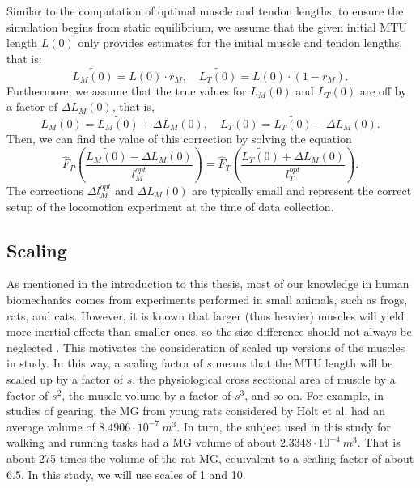 \documentclass{sfuthesis}
\numberwithin{equation}{section}
\numberwithin{figure}{chapter}
\numberwithin{table}{chapter}
\theoremstyle{definition}
\begin{document}
Similar to the computation of optimal muscle and tendon lengths, to ensure the simulation begins from static equilibrium, we assume that the given initial MTU length $L(0)$ only provides estimates for the initial muscle and tendon lengths, that is:
\begin{equation}
    \widetilde{L_M(0)} = L(0) \cdot r_M, \quad \widetilde{L_T(0)} = L(0) \cdot (1-r_M).
\end{equation}
Furthermore, we assume that the true values for $L_M(0)$ and $L_T(0)$ are off by a factor of $\Delta L_M(0)$, that is, 
\begin{equation}
    L_M(0) =  \widetilde{L_M(0)} + \Delta L_M(0), \quad L_T(0) = \widetilde{L_T(0)} - \Delta L_M(0).
\end{equation}
Then, we can find the value of this correction by solving the equation
\begin{equation} \label{eq:calibration_2}
    \widehat{F}_P \left( \dfrac{\widetilde{L_M(0)} - \Delta L_M(0)}{l_M^{opt}}\right) = \widehat{F}_T \left( \dfrac{\widetilde{L_T(0)} + \Delta L_M(0)}{l_T^{opt}}\right).
\end{equation}
The corrections $\Delta l_M^{opt}$ and $\Delta L_M(0)$ are typically small and represent the correct setup of the locomotion experiment at the time of data collection.

\subsection{Scaling}

As mentioned in the introduction to this thesis, most of our knowledge in human biomechanics comes from experiments performed in small animals, such as frogs, rats, and cats. 
However, it is known that larger (thus heavier) muscles will yield more inertial effects than smaller ones, so the size difference should not always be neglected \cite{EvanThesis,Ross2018}. This motivates the consideration of scaled up versions of the muscles in study. In this way, a scaling factor of $s$ means that the MTU length will be scaled up by a factor of $s$, the physiological cross sectional area of muscle by a factor of $s^2$, the muscle volume by a factor of $s^3$, and so on. For example, in studies of gearing, the MG from young rats considered by Holt et al. \cite{Holt2016} had an average volume of $8.4906 \cdot 10^{-7} \ m^3$. In turn, the subject used in this study for walking and running tasks had a MG volume of about $2.3348 \cdot 10^{-4} \ m^3$. That is about 275 times the volume of the rat MG, equivalent to a scaling factor of about 6.5. In this study, we will use scales of 1 and 10.
\end{document}
